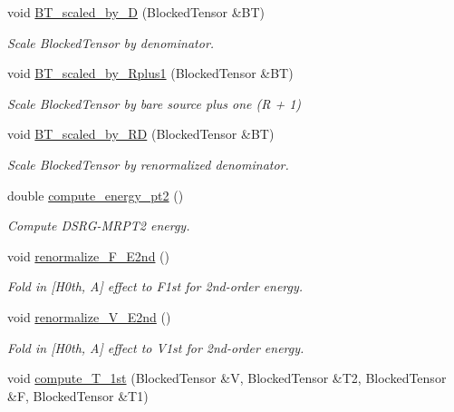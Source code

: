 \begin{DoxyCompactItemize}
void \mbox{\hyperlink{classforte_1_1_d_s_r_g___m_r_p_t_af2ff0ea55a2b0c8666df7b8de3f8559e}{B\+T\+\_\+scaled\+\_\+by\+\_\+D}} (Blocked\+Tensor \&BT)
\begin{DoxyCompactList}\small\item\em Scale Blocked\+Tensor by denominator. \end{DoxyCompactList}\item 
void \mbox{\hyperlink{classforte_1_1_d_s_r_g___m_r_p_t_a1d3cd0885893291d68a94b40e84d2958}{B\+T\+\_\+scaled\+\_\+by\+\_\+\+Rplus1}} (Blocked\+Tensor \&BT)
\begin{DoxyCompactList}\small\item\em Scale Blocked\+Tensor by bare source plus one (R + 1) \end{DoxyCompactList}\item 
void \mbox{\hyperlink{classforte_1_1_d_s_r_g___m_r_p_t_a30b920334696368308a0517785197f87}{B\+T\+\_\+scaled\+\_\+by\+\_\+\+RD}} (Blocked\+Tensor \&BT)
\begin{DoxyCompactList}\small\item\em Scale Blocked\+Tensor by renormalized denominator. \end{DoxyCompactList}\item 
double \mbox{\hyperlink{classforte_1_1_d_s_r_g___m_r_p_t_a1098b57f27bf9694a24359d4433dc755}{compute\+\_\+energy\+\_\+pt2}} ()
\begin{DoxyCompactList}\small\item\em Compute D\+S\+R\+G-\/\+M\+R\+P\+T2 energy. \end{DoxyCompactList}\item 
void \mbox{\hyperlink{classforte_1_1_d_s_r_g___m_r_p_t_a03fcfc33cda5959a7c0df3de84bd2576}{renormalize\+\_\+\+F\+\_\+\+E2nd}} ()
\begin{DoxyCompactList}\small\item\em Fold in \mbox{[}H0th, A\mbox{]} effect to F1st for 2nd-\/order energy. \end{DoxyCompactList}\item 
void \mbox{\hyperlink{classforte_1_1_d_s_r_g___m_r_p_t_aac4471beedf5d27b23320c28a6c739a8}{renormalize\+\_\+\+V\+\_\+\+E2nd}} ()
\begin{DoxyCompactList}\small\item\em Fold in \mbox{[}H0th, A\mbox{]} effect to V1st for 2nd-\/order energy. \end{DoxyCompactList}\item 
void \mbox{\hyperlink{classforte_1_1_d_s_r_g___m_r_p_t_acae3b09d4863198ab6c7c19d91b9560e}{compute\+\_\+\+T\+\_\+1st}} (Blocked\+Tensor \&V, Blocked\+Tensor \&T2, Blocked\+Tensor \&F, Blocked\+Tensor \&T1)

\end{DoxyCompactItemize}
